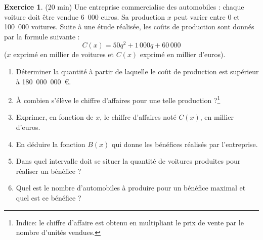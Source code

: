 \documentclass{exam}
\theoremstyle{definition}
\newtheorem{exercice}{Exercice}
\begin{document}
\begin{exercice}{(20 min)}
Une entreprise commercialise des automobiles : chaque voiture doit être vendue 6 000 euros. Sa production $x$ peut varier entre 0 et 100 000 voitures. Suite à une étude réalisée, les coûts de production sont donnés par la formule suivante :
\[
C(x) = 50q^2 + 1\,000q + 60\,000
\]
($x$ exprimé en millier de voitures et $C(x)$ exprimé en millier d’euros).


\begin{enumerate}
    \item Déterminer la quantité à partir de laquelle le coût de production est supérieur à 180 000 000 €.
    \item À combien s’élève le chiffre d’affaires pour une telle production ?\footnote{Indice: le chiffre d'affaire est obtenu en multipliant le prix de vente par le nombre d'unités vendues.}
    \item Exprimer, en fonction de $x$, le chiffre d’affaires noté $C(x)$, en millier d’euros.
    \item En déduire la fonction $B(x)$ qui donne les bénéfices réalisés par l’entreprise.
    \item Dans quel intervalle doit se situer la quantité de voitures produites pour réaliser un bénéfice ?
    \item Quel est le nombre d’automobiles à produire pour un bénéfice maximal et quel est ce bénéfice ?
\end{enumerate}
\end{exercice}    
\end{document}
